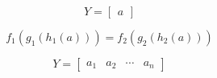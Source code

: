 \documentclass[sn-mathphys-num]{sn-jnl}%
\theoremstyle{thmstyleone}%
\theoremstyle{thmstyletwo}%
\theoremstyle{thmstylethree}%
\begin{document}
\begin{appendices}


% 


\begin{equation}
    Y = \begin{bmatrix}
        a
    \end{bmatrix}
\end{equation}

\begin{equation}
    f_1 \left( g_1\left( h_1(a) \right) \right)
    = f_2 \left( g_2\left( h_2(a) \right) \right)
\end{equation}

\begin{equation}
    Y = \begin{bmatrix}
        a_1 & a_2 & \cdots & a_n
    \end{bmatrix}
\end{equation}


\end{appendices}
\end{document}
